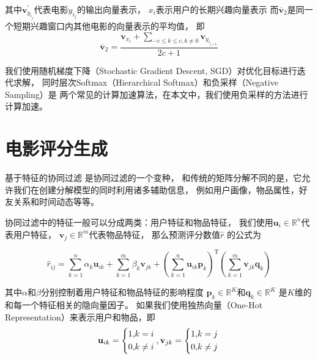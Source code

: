 其中$\mathbf{v}_{y_{i_j}}^{'}$代表电影$y_{i_j}$的输出向量表示，
$x_i$表示用户的长期兴趣向量表示
而$\overline{\mathbf{v}}_{2}$是同一个短期兴趣窗口内其他电影的向量表示的平均值，
即
\begin{equation}
\overline{\mathbf{v}}_{2} = \frac{
    \mathbf{v}_{x_i} + 
    \sum_{-c \leq k \leq c, k \not= 0}{\mathbf{v}_{y_{i_{j+k}}}}
}{2c+1}
\end{equation}

我们使用随机梯度下降（Stochastic Gradient Descent, SGD）对优化目标进行迭代求解，
同时层次Softmax（Hierarchical Softmax）和负采样（Negative Sampling）是
两个常见的计算加速算法，在本文中，我们使用负采样的方法进行计算加速。

\section{电影评分生成}
基于特征的协同过滤 \parencite{chen2011feature} 是协同过滤的一个变种，
和传统的矩阵分解不同的是，它允许我们在创建分解模型的同时利用诸多辅助信息，
例如用户画像，物品属性，好友关系和时间动态等等。

协同过滤中的特征一般可以分成两类：用户特征和物品特征，
我们使用$\mathbf{u}_i \in \mathbb{R}^{n}$代表用户特征，
$\mathbf{v}_j \in \mathbb{R}^{m}$代表物品特征，
那么预测评分数值$\hat{r}$ 的公式为

\begin{equation}
\hat{r}_{ij} = \sum_{k=1}^{n} \alpha_k \mathbf{u}_{ik} + \sum_{k=1}^{m} \beta_k \mathbf{v}_{jk} +
\left( \sum_{k=1}^{n} \mathbf{u}_{ik} \mathbf{p}_k \right) ^ \mathrm{T}
\left( \sum_{k=1}^{m} \mathbf{v}_{jk} \mathbf{q}_k \right)
\end{equation}

其中$\alpha$和$\beta$分别控制着用户特征和物品特征的影响程度
$\mathbf{p}_{k} \in \mathbb{R}^K$和$\mathbf{q}_{k} \in \mathbb{R}^K$
是$K$维的和每一个特征相关的隐向量因子。
如果我们使用独热向量（One-Hot Representation）来表示用户和物品，即
\begin{equation}
\mathbf{u}_{ik} =
\left\{
\begin{aligned}
1, &k = i \\
0, &k \not= i
\end{aligned}
\right. \\ , 
\mathbf{v}_{jk} =
\left\{
\begin{aligned}
1, &k = j \\
0, &k \not= j
\end{aligned}
\right. \\
\end{equation}


